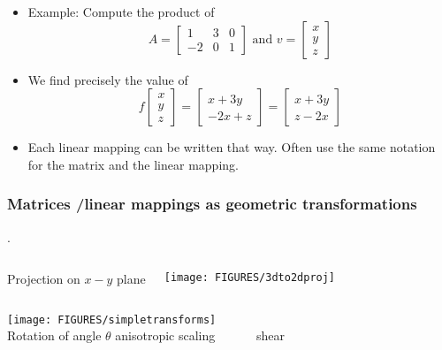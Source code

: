 \documentclass[8pt]{beamer}
\begin{document}
\begin{frame}
  \begin{itemize}
  \item Example: Compute the product of 
    $$
    A =
    \begin{bmatrix}
        1 & 3 & 0\\
      -2 & 0 & 1
    \end{bmatrix}\text{ and }
    v =
    \begin{bmatrix}
      x\\y\\z
    \end{bmatrix}
    $$
    \pause
  \item We find precisely the value of 
    $$   
    f
    \begin{bmatrix}
      x\\y\\z
    \end{bmatrix}
    =
    \begin{bmatrix}
      x+3y\\-2x+z
    \end{bmatrix}=
    \begin{bmatrix}
      x+3y\\z-2x
    \end{bmatrix}
    $$
  \item Each linear mapping can be written that way. Often use the same notation for the matrix and the linear mapping.
  \end{itemize}
\end{frame}



\begin{frame}
  \frametitle{Matrices /linear mappings as geometric transformations}. 
  \begin{columns}
    \begin{center}
    Projection  on $x-y$ plane
    \end{center}
    \texttt{[image: FIGURES/3dto2dproj]}
  \end{columns}
  \begin{center}
    \texttt{[image: FIGURES/simpletransforms]}\\
    Rotation of angle $\theta$ \hfill anisotropic scaling \hfill ~~~~~~shear~~~~~~~~~~~
  \end{center}
\end{frame}
\end{document}
